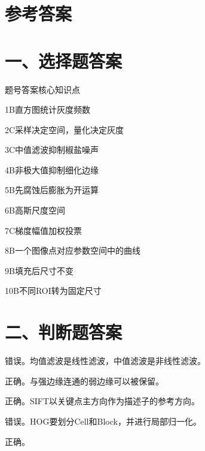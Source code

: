 \documentclass[UTF8,openany,oneside,zihao=-4,fontset=windows]{ctexbook}
\begin{document}
\section{参考答案}
\section{一、选择题答案}
\par 题号\quad 答案\quad 核心知识点
\par 1\quad B\quad 直方图统计灰度频数
\par 2\quad C\quad 采样决定空间，量化决定灰度
\par 3\quad C\quad 中值滤波抑制椒盐噪声
\par 4\quad B\quad 非极大值抑制细化边缘
\par 5\quad B\quad 先腐蚀后膨胀为开运算
\par 6\quad B\quad 高斯尺度空间
\par 7\quad C\quad 梯度幅值加权投票
\par 8\quad B\quad 一个图像点对应参数空间中的曲线
\par 9\quad B\quad 填充后尺寸不变
\par 10\quad B\quad 不同ROI转为固定尺寸
\section{二、判断题答案}
\par 错误。均值滤波是线性滤波，中值滤波是非线性滤波。
\par 正确。与强边缘连通的弱边缘可以被保留。
\par 正确。SIFT以关键点主方向作为描述子的参考方向。
\par 错误。HOG要划分Cell和Block，并进行局部归一化。
\par 正确。
\end{document}
